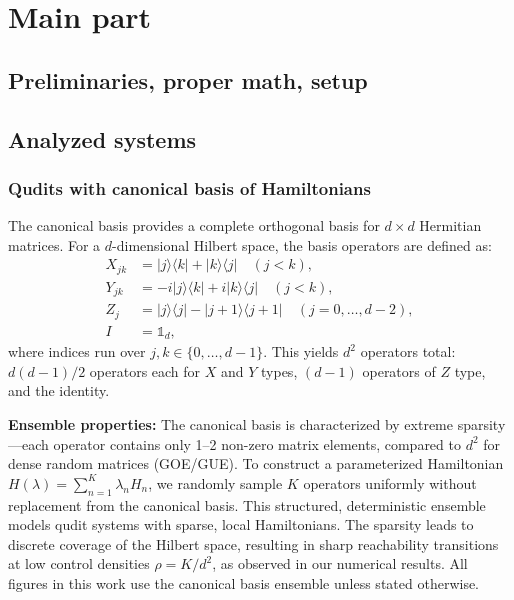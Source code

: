 \documentclass[aps,prx,reprint,superscriptaddress,footnote, twocolumn,notitlepage]{revtex4-2}
\begin{document}
\section{Main part }
\subsection{Preliminaries, proper math, setup}
\subsection{Analyzed systems}\label{sec:systems}
\subsubsection{Qudits with canonical basis of Hamiltonians}
The canonical basis provides a complete orthogonal basis for $d\times d$ Hermitian matrices. For a $d$-dimensional Hilbert space, the basis operators are defined as:
\begin{equation}
\begin{aligned}
X_{jk} &= |j\rangle\langle k| + |k\rangle\langle j| \quad (j < k), \\
Y_{jk} &= -i|j\rangle\langle k| + i|k\rangle\langle j| \quad (j < k), \\
Z_j &= |j\rangle\langle j| - |j+1\rangle\langle j+1| \quad (j = 0, \ldots, d-2), \\
I &= \mathbb{1}_d,
\end{aligned}
\label{eq:canonical_basis}
\end{equation}
where indices run over $j, k \in \{0, \ldots, d-1\}$. This yields $d^2$ operators total: $d(d-1)/2$ operators each for $X$ and $Y$ types, $(d-1)$ operators of $Z$ type, and the identity.

\textbf{Ensemble properties:} The canonical basis is characterized by extreme sparsity---each operator contains only 1--2 non-zero matrix elements, compared to $d^2$ for dense random matrices (GOE/GUE). To construct a parameterized Hamiltonian $H(\lambda) = \sum_{n=1}^{K} \lambda_n H_n$, we randomly sample $K$ operators uniformly without replacement from the canonical basis. This structured, deterministic ensemble models qudit systems with sparse, local Hamiltonians. The sparsity leads to discrete coverage of the Hilbert space, resulting in sharp reachability transitions at low control densities $\rho = K/d^2$, as observed in our numerical results. All figures in this work use the canonical basis ensemble unless stated otherwise.
\end{document}

